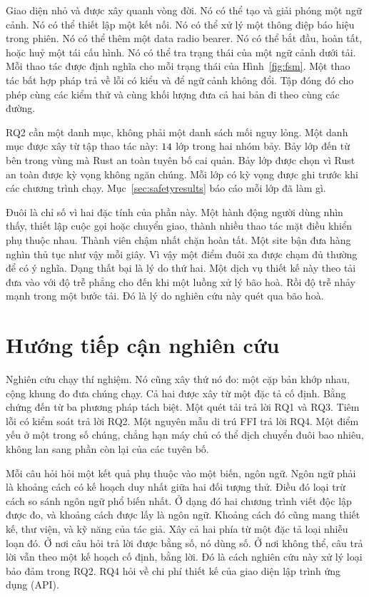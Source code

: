 Giao diện nhỏ và được xây quanh vòng đời. Nó có thể tạo và giải phóng một ngữ cảnh. Nó có thể
thiết lập một kết nối. Nó có thể xử lý một thông điệp báo hiệu trong phiên. Nó có thể thêm một
data radio bearer. Nó có thể bắt đầu, hoàn tất, hoặc huỷ một tái cấu hình. Nó có thể tra trạng
thái của một ngữ cảnh dưới tải. Mỗi thao tác được định nghĩa cho mỗi trạng thái của
Hình~\ref{fig:fsm}. Một thao tác bất hợp pháp trả về lỗi có kiểu và để ngữ cảnh không đổi. Tập
đóng đó cho phép cùng các kiểm thử và cùng khối lượng đưa cả hai bản đi theo cùng các đường.

RQ2 cần một danh mục, không phải một danh sách mối nguy lỏng. Một danh mục được xây từ tập thao
tác này: $14$ lớp trong hai nhóm bảy. Bảy lớp đến từ bên trong vùng mà Rust an toàn
tuyên bố cai quản. Bảy lớp được chọn vì Rust an toàn được kỳ vọng không ngăn chúng. Mỗi lớp có
kỳ vọng được ghi trước khi các chương trình chạy. Mục~\ref{sec:safetyresults} báo cáo mỗi lớp
đã làm gì.

Đuôi là chỉ số vì hai đặc tính của phần này. Một hành động người dùng nhìn thấy, thiết lập cuộc
gọi hoặc chuyển giao, thành nhiều thao tác mặt điều khiển phụ thuộc nhau. Thành viên chậm nhất
chặn hoàn tất. Một site bận đưa hàng nghìn thủ tục như vậy mỗi giây. Vì vậy một điểm đuôi xa
được chạm đủ thường để có ý nghĩa. Dạng thất bại là lý do thứ hai. Một dịch vụ thiết kế này
theo tải đưa vào với độ trễ phẳng cho đến khi một luồng xử lý bão hoà. Rồi độ trễ nhảy mạnh
trong một bước tải. Đó là lý do nghiên cứu này quét qua bão hoà.

\section{Hướng tiếp cận nghiên cứu}\label{sec:approach}
Nghiên cứu chạy thí nghiệm. Nó cũng xây thứ nó đo: một cặp bản khớp nhau, cộng khung đo đưa
chúng chạy. Cả hai được xây từ một đặc tả cố định. Bằng chứng đến từ ba phương pháp tách biệt.
Một quét tải trả lời RQ1 và RQ3. Tiêm lỗi có kiểm soát trả lời RQ2. Một nguyên mẫu di trú FFI
trả lời RQ4. Một điểm yếu ở một trong số chúng, chẳng hạn máy chủ có thể dịch chuyển đuôi bao
nhiêu, không lan sang phần còn lại của các tuyên bố.

Mỗi câu hỏi hỏi một kết quả phụ thuộc vào một biến, ngôn ngữ. Ngôn ngữ phải là khoảng cách có
kế hoạch duy nhất giữa hai đối tượng thử. Điều đó loại trừ cách so sánh ngôn ngữ phổ biến nhất.
Ở dạng đó hai chương trình viết độc lập được đo, và khoảng cách được lấy là ngôn ngữ. Khoảng
cách đó cũng mang thiết kế, thư viện, và kỹ năng của tác giả. Xây cả hai phía từ một đặc tả loại
nhiễu loạn đó. Ở nơi câu hỏi trả lời được bằng số, nó dùng số. Ở nơi không thể, câu trả lời vẫn
theo một kế hoạch cố định, bằng lời. Đó là cách nghiên cứu này xử lý loại bảo đảm trong RQ2.
RQ4 hỏi về chi phí thiết kế của giao diện lập trình ứng dụng (API).

